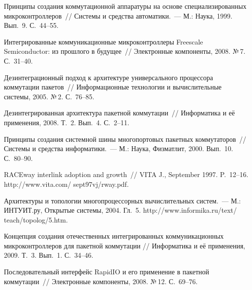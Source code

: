 \begin{multicols}{2}
\vspace*{-3pt}

{\small\frenchspacing
{%
\begin{thebibliography}{9}    
Принципы создания коммутационной аппаратуры на основе специализированных 
микроконтроллеров~// Системы и средства автоматики.~--- М.: Наука, 1999. Вып.~9. С.~44--55.

Интегрированные коммуникационные микроконтроллеры Freescale Semiconductor: из прош\-ло\-го в 
будущее~// Электронные компоненты, 2008. №\,7. С.~31--40.

Дезинтеграционный подход к архитектуре универсального процессора коммутации пакетов~// 
Информационные технологии и вычислительные системы, 2005. №\,2. С.~76--85.

Дезинтегрированная архитектура пакетной коммутации~// Информатика и её применения, 2008. Т.~2. 
Вып.~4. С.~2--11.

Принципы создания сис\-тем\-ной шины многопортовых пакетных коммутаторов~// Системы и средства 
информатики.~--- М.: Наука, Физматлит, 2000. Вып.~10. С.~80--90.

RACEway interlink adoption and growth~// VITA J., September 1997. P.~12--16. {\sf 
http://www.vita.com/ sept97vj/rway.pdf}.

Ар\-хи\-тек\-ту\-ры и топологии многопроцессорных вы\-чис\-ли\-тель\-ных систем.~--- М.: ИНТУИТ.ру, 
Открытые системы, 2004. Гл.~5. {\sf http://www.informika.ru/text/ teach/topolog/5.htm}.

Концепция создания отечественных интегрированных коммуникационных микроконтроллеров для 
пакетной коммутации // Информатика и её применения, 2009. Т.~3. Вып.~1. С.~34--46.

\label{end\stat}

Последовательный интерфейс RapidIO и его применение в пакетной коммутации~// Электронные 
компоненты, 2008. №\,12. С.~69--76.

\end{thebibliography}
}
}
\end{multicols}
  
 
 
 